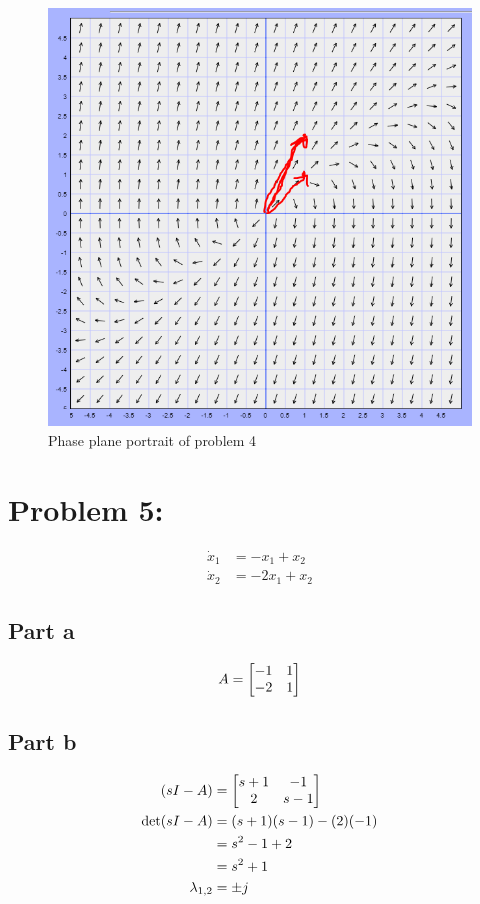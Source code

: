 \documentclass[]{article}
\begin{document}
\begin{figure}[p]
	\centering
	\includegraphics[width=0.7\linewidth]{fig/pblm4_w_vectors}
	\caption{Phase plane portrait of problem 4}
	\label{fig:pblm4}
\end{figure}


\newpage
\section{Problem 5:}
\begin{align*}
	\dot{x}_1 &= - x_1 + x_2\\
	\dot{x}_2 &= - 2 x_1 + x_2
\end{align*}

\subsection{Part a}
\begin{displaymath}
	A = \mqty[-1&1\\-2&1]
\end{displaymath}

\subsection{Part b}

\begin{align*}
	(sI - A)
	&= \mqty[s+1 & -1\\ 2 & s-1]\\
	\det(sI-A)
	&= (s+1)(s-1) - (2)(-1)\\
	&= s^2 -1 + 2\\
	&= s^2 + 1\\
	\lambda_{1,2}
	&= \pm j
\end{align*}
\end{document}
